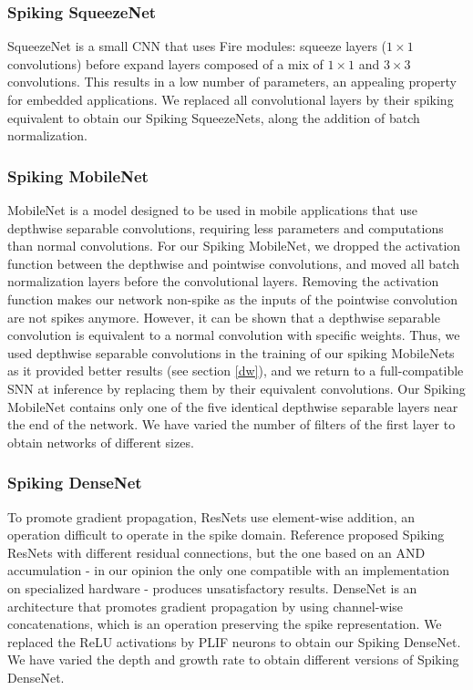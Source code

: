 \documentclass[conference]{IEEEtran}
\begin{document}
\subsubsection{Spiking SqueezeNet}
SqueezeNet \cite{squeezenet} is a small CNN that uses Fire modules: squeeze layers ($1\times 1$ convolutions) before expand layers composed of a mix of $1\times 1$ and $3\times 3$ convolutions. This results in a low number of parameters, an appealing property for embedded applications. We replaced all convolutional layers by their spiking equivalent to obtain our Spiking SqueezeNets, along the addition of batch normalization. \\

\subsubsection{Spiking MobileNet}
MobileNet \cite{mobilenet} is a model designed to be used in mobile applications that use depthwise separable convolutions, requiring less parameters and computations than normal convolutions. For our Spiking MobileNet, we dropped the activation function between the depthwise and pointwise convolutions, and moved all batch normalization layers before the convolutional layers. Removing the activation function makes our network non-spike as the inputs of the pointwise convolution are not spikes anymore. However, it can be shown that a depthwise separable convolution is equivalent to a normal convolution with specific weights. Thus, we used depthwise separable convolutions in the training of our spiking MobileNets as it provided better results (see section \ref{dw}), and we return to a full-compatible SNN at inference by replacing them by their equivalent convolutions. Our Spiking MobileNet contains only one of the five identical depthwise separable layers near the end of the network. We have varied the number of filters of the first layer to obtain networks of different sizes. \\

\subsubsection{Spiking DenseNet}
To promote gradient propagation, ResNets use element-wise addition, an operation difficult to operate in the spike domain. Reference \cite{wei_neurips} proposed Spiking ResNets with different residual connections, but the one based on an AND accumulation - in our opinion the only one compatible with an implementation on specialized hardware - produces unsatisfactory results. DenseNet \cite{densenet} is an architecture that promotes gradient propagation by using channel-wise concatenations, which is an operation preserving the spike representation. We replaced the ReLU activations by PLIF neurons to obtain our Spiking DenseNet. We have varied the depth and growth rate to obtain different versions of Spiking DenseNet.
\end{document}
